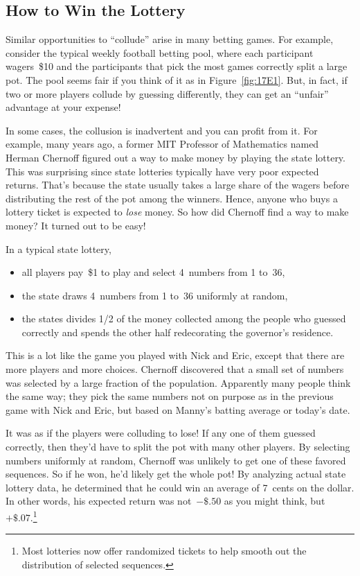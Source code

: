 \subsection{How to Win the Lottery}

Similar opportunities to ``collude'' arise in many betting games.
For example, consider the typical weekly football betting pool, where
each participant wagers~\$10 and the participants that pick the most
games correctly split a large pot.  The pool seems fair if you think
of it as in Figure~\ref{fig:17E1}.  But, in fact, if two or more
players collude by guessing differently, they can get an
``unfair'' advantage at your expense!

In some cases, the collusion is inadvertent and you can profit
from it.  For example, many years ago, a former MIT Professor of
Mathematics named Herman Chernoff figured out a way to make money by
playing the state lottery.  This was surprising since state lotteries
typically have very poor expected returns.  That's because the state
usually takes a large share of the wagers before distributing the rest
of the pot among the winners.  Hence, anyone who buys a lottery ticket
is expected to \emph{lose} money.  So how did Chernoff find a way to
make money?  It turned out to be easy!

In a typical state lottery,
\begin{itemize}

\item all players pay~\$1 to play and select 4~numbers from 1 to~36,

\item the state draws 4~numbers from 1 to~36 uniformly at random,

\item the states divides 1/2 of the money collected among the people
  who guessed correctly and spends the other half redecorating the
  governor's residence.

\end{itemize}
This is a lot like the game you played with Nick and Eric, except that
there are more players and more choices.  Chernoff discovered that a
small set of numbers was selected by a large fraction of the
population.  Apparently many people think the same way; they pick the
same numbers not on purpose as in the previous game with Nick and
Eric, but based on Manny's batting average or today's date.

It was as if the players were colluding to lose!  If any one of them
guessed correctly, then they'd have to split the pot with many other
players.  By selecting numbers uniformly at random, Chernoff was
unlikely to get one of these favored sequences.  So if he won, he'd
likely get the whole pot!  By analyzing actual state lottery data, he
determined that he could win an average of 7~cents on the dollar.  In
other words, his expected return was not~$-\${.}50$ as you might
think, but~$+\${.}07$.\footnote{Most lotteries now offer randomized
  tickets to help smooth out the distribution of selected sequences.}

